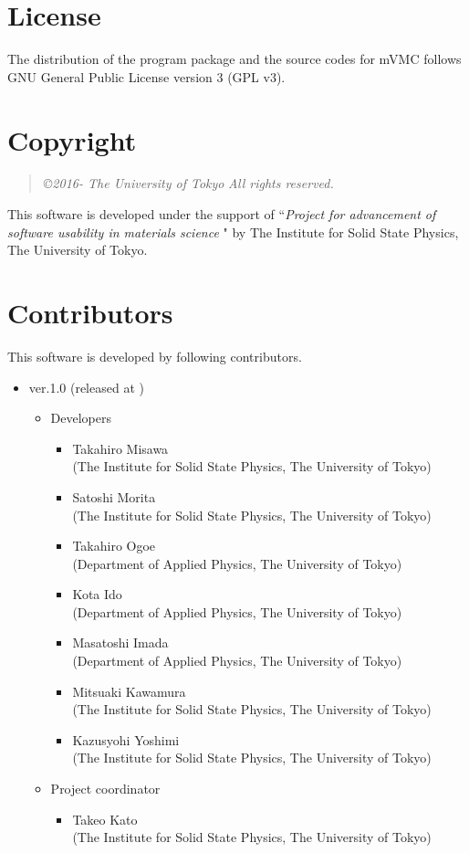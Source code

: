 \section{License}
The distribution of the program package and the source codes for mVMC follows GNU General Public License version 3 (GPL v3). 
\section{Copyright}
\begin{quote}
{\it \copyright 2016- The University of Tokyo} {\it  All rights reserved.}
\end{quote}
This software is developed under the support of ``{\it Project for advancement of software usability in materials science }" by The Institute for Solid State Physics, The University of Tokyo. 

\section{Contributors}
\label{subsec:developers}
This software is developed by following contributors.
\begin{itemize}
\item{ver.1.0 (released at )}
\begin{itemize}
\item{Developers}
	\begin{itemize}
	\item{Takahiro Misawa \\(The Institute for Solid State Physics, The University of Tokyo)}
	\item{Satoshi Morita \\(The Institute for Solid State Physics, The University of Tokyo)}
	\item{Takahiro Ogoe \\(Department of Applied Physics, The University of Tokyo)}
	\item{Kota Ido \\(Department of Applied Physics, The University of Tokyo)}
	\item{Masatoshi Imada \\(Department of Applied Physics, The University of Tokyo)}
	\item{Mitsuaki Kawamura \\(The Institute for Solid State Physics, The University of Tokyo)}
	\item{Kazusyohi Yoshimi \\(The Institute for Solid State Physics, The University of Tokyo)}
	\end{itemize}

\item{Project coordinator}
	\begin{itemize}
	\item{Takeo Kato \\(The Institute for Solid State Physics, The University of Tokyo)}
	\end{itemize}

\end{itemize}

\end{itemize}


